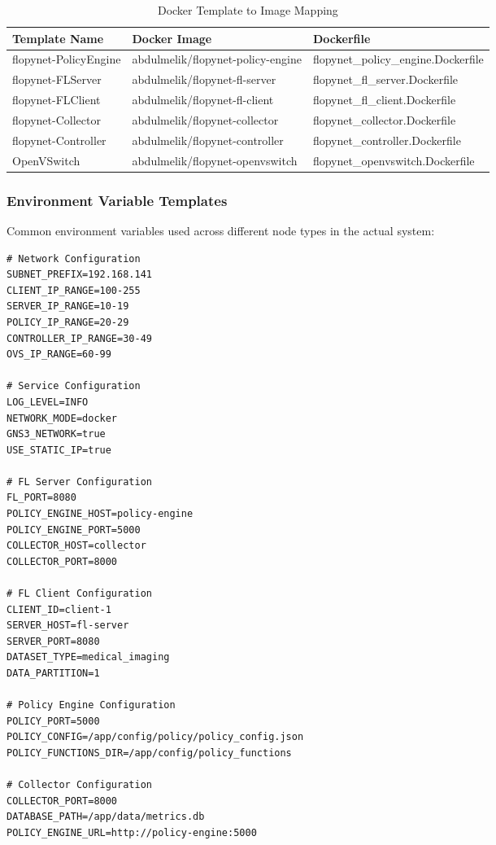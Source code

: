 \begin{table}[H]
\centering
\caption{Docker Template to Image Mapping}
\label{tab:docker-templates}
\begin{tabular}{@{}lll@{}}
\toprule
\textbf{Template Name} & \textbf{Docker Image} & \textbf{Dockerfile} \\
\midrule
flopynet-PolicyEngine & abdulmelik/flopynet-policy-engine & flopynet\_policy\_engine.Dockerfile \\
flopynet-FLServer & abdulmelik/flopynet-fl-server & flopynet\_fl\_server.Dockerfile \\
flopynet-FLClient & abdulmelik/flopynet-fl-client & flopynet\_fl\_client.Dockerfile \\
flopynet-Collector & abdulmelik/flopynet-collector & flopynet\_collector.Dockerfile \\
flopynet-Controller & abdulmelik/flopynet-controller & flopynet\_controller.Dockerfile \\
OpenVSwitch & abdulmelik/flopynet-openvswitch & flopynet\_openvswitch.Dockerfile \\
\bottomrule
\end{tabular}
\end{table}

\subsubsection{Environment Variable Templates}

Common environment variables used across different node types in the actual system:

\begin{lstlisting}[style=bashcode, caption=Common Environment Variables]
# Network Configuration
SUBNET_PREFIX=192.168.141
CLIENT_IP_RANGE=100-255
SERVER_IP_RANGE=10-19
POLICY_IP_RANGE=20-29
CONTROLLER_IP_RANGE=30-49
OVS_IP_RANGE=60-99

# Service Configuration
LOG_LEVEL=INFO
NETWORK_MODE=docker
GNS3_NETWORK=true
USE_STATIC_IP=true

# FL Server Configuration
FL_PORT=8080
POLICY_ENGINE_HOST=policy-engine
POLICY_ENGINE_PORT=5000
COLLECTOR_HOST=collector
COLLECTOR_PORT=8000

# FL Client Configuration
CLIENT_ID=client-1
SERVER_HOST=fl-server
SERVER_PORT=8080
DATASET_TYPE=medical_imaging
DATA_PARTITION=1

# Policy Engine Configuration
POLICY_PORT=5000
POLICY_CONFIG=/app/config/policy/policy_config.json
POLICY_FUNCTIONS_DIR=/app/config/policy_functions

# Collector Configuration
COLLECTOR_PORT=8000
DATABASE_PATH=/app/data/metrics.db
POLICY_ENGINE_URL=http://policy-engine:5000
\end{lstlisting}

